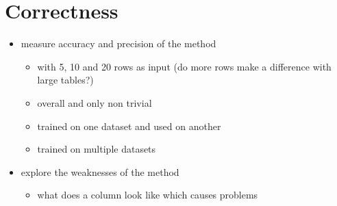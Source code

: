 \section{Correctness}
\begin{itemize}
  \item measure accuracy and precision of the method
        \begin{itemize}
          \item with 5, 10 and 20 rows as input (do more rows make a difference with large tables?)
          \item overall and only non trivial
          \item trained on one dataset and used on another
          \item trained on multiple datasets
        \end{itemize}
  \item explore the weaknesses of the method
        \begin{itemize}
          \item what does a column look like which causes problems
        \end{itemize}
\end{itemize}